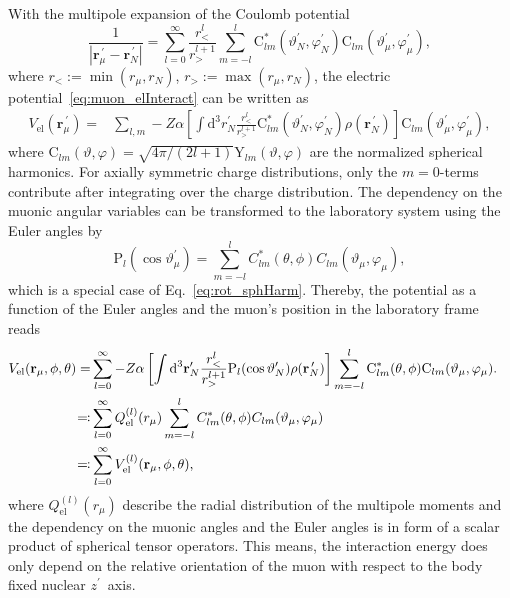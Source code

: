 With the multipole expansion of the Coulomb potential~\cite{jackson1999}
\begin{equation}
\frac{1}{|\mathbf{r}_\mu^{\,\prime}-\mathbf{r}_N^{\,\prime}|}=\sum_{l=0}^\infty \frac{r_<^l}{r_>^{l+1}}\sum_{m=-l}^l  \text{C}^*_{lm}(\vartheta_N^{\prime},\varphi_N^{\prime})\text{C}_{lm}(\vartheta_\mu^\prime,\varphi_\mu^\prime),
\end{equation}
where $r_<:=\min (r_\mu,r_N)$, $r_>:=\max (r_\mu,r_N)$, the electric potential~\eqref{eq:muon_elInteract} can be written as
\begin{align}
V_{\text{el}}(\mathbf{r}_\mu^{\,\prime})=&\sum_{l,m}-Z\alpha \left[ \int \text{d}^3r^{\prime}_N \frac{r_<^l}{r_>^{l+1}}\text{C}^*_{lm}(\vartheta_N^{\prime},\varphi_N^{\prime})\rho(\mathbf{r}_N^{\,\prime})\right]\text{C}_{lm}(\vartheta_\mu^{\prime},\varphi_\mu^\prime),
\end{align}
where ${\text{C}_{lm}(\vartheta,\varphi)}{=}{\sqrt{4\pi/(2l+1)}\text{Y}_{lm}(\vartheta,\varphi)}$ are the normalized spherical harmonics.
For axially symmetric charge distributions, only the ${m}{=}{0}$-terms contribute after integrating over the charge distribution. The dependency on the muonic angular variables can be transformed to the laboratory system using the Euler angles by
\begin{equation}
\text{P}_{l}(\cos\vartheta_\mu^\prime)=
 \sum_{m=-l}^l C^*_{lm}(\theta,\phi)C_{lm}(\vartheta_\mu,\varphi_\mu),
\end{equation}
which is a special case of Eq.~\eqref{eq:rot_sphHarm}.
Thereby, the potential as a function of the Euler angles and the muon's position in the laboratory frame reads
\begin{align}
V_{\text{el}}(\mathbf{r}_\mu,\phi,\theta)=&\sum_{l=0}^\infty-Z\alpha \left[ \int \text{d}^3\mathbf{r}^{\prime}_N \frac{r_<^l}{r_>^{l+1}}\text{P}_{l}(\cos \vartheta_N^{\prime})\rho(\mathbf{r}_N^{\,\prime})\right]\sum_{m=-l}^l \text{C}^*_{lm}(\theta,\phi)\text{C}_{lm}(\vartheta_\mu,\varphi_\mu).\notag\\
\eqqcolon &\sum_{l=0}^\infty Q_{\text{el}}^{(l)}(r_\mu)\sum_{m=-l}^lC^*_{lm}(\theta,\phi)C_{lm}(\vartheta_\mu,\varphi_\mu)&\notag\\
\eqqcolon& \sum_{l=0}^\infty V^{(l)}_{\text{el}}(\mathbf{r}_\mu,\phi,\theta),
\label{eq:defmulti}
\end{align}
where $Q_{\text{el}}^{(l)}(r_\mu)$ describe the radial distribution of the multipole moments and the dependency on the muonic angles and the Euler angles is in form of a scalar product of spherical tensor operators. This means, the interaction energy does only depend on the relative orientation of the muon with respect to the body fixed nuclear $z^\prime$~axis.

